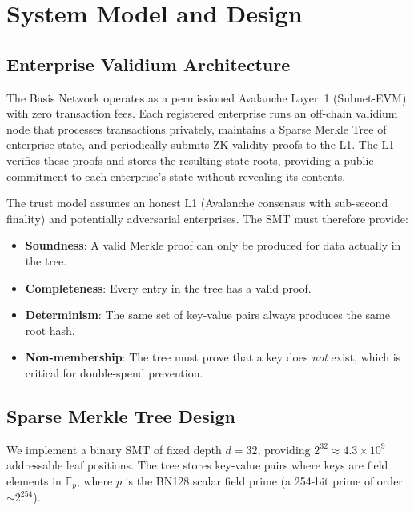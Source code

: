 
\section{System Model and Design}
\label{sec:system-model}

\subsection{Enterprise Validium Architecture}

The Basis Network operates as a permissioned Avalanche Layer~1 (Subnet-EVM) with zero transaction fees. Each registered enterprise runs an off-chain validium node that processes transactions privately, maintains a Sparse Merkle Tree of enterprise state, and periodically submits ZK validity proofs to the L1. The L1 verifies these proofs and stores the resulting state roots, providing a public commitment to each enterprise's state without revealing its contents.

The trust model assumes an honest L1 (Avalanche consensus with sub-second finality) and potentially adversarial enterprises. The SMT must therefore provide:

\begin{itemize}
  \item \textbf{Soundness}: A valid Merkle proof can only be produced for data actually in the tree.
  \item \textbf{Completeness}: Every entry in the tree has a valid proof.
  \item \textbf{Determinism}: The same set of key-value pairs always produces the same root hash.
  \item \textbf{Non-membership}: The tree must prove that a key does \emph{not} exist, which is critical for double-spend prevention.
\end{itemize}

\subsection{Sparse Merkle Tree Design}

We implement a binary SMT of fixed depth $d = 32$, providing $2^{32} \approx 4.3 \times 10^9$ addressable leaf positions. The tree stores key-value pairs where keys are field elements in $\mathbb{F}_p$, where $p$ is the BN128 scalar field prime (a 254-bit prime of order ${\sim}2^{254}$).

